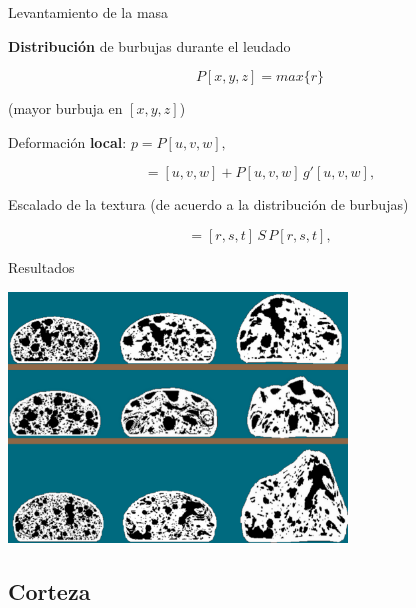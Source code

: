 \documentclass[spanish,unknownkeysallowed]{beamer}
\begin{document}
\begin{frame}{Levantamiento de la masa}

\textbf{Distribución} de burbujas durante el leudado

\begin{equation*}
P[x,y,z] = max \bigg\{r\bigg\}
\end{equation*}

(mayor burbuja en $[x,y,z]$)

\vspace{0.2cm}

Deformación \textbf{local}: $p = P[u,v,w],$

\begin{equation*}
[r,s,t] = [u,v,w] + P[u,v,w] \, g'[u,v,w],
\end{equation*}



Escalado de la textura (de acuerdo a la distribución de burbujas)


\begin{equation}
[x,y,z] = [r,s,t]\, S \, P[r,s,t],
\end{equation}

\end{frame}

\begin{frame}{Resultados}

\centerline{\includegraphics[width=9cm]{../figures/Fig9}}

\end{frame}

\subsection{Corteza}
\end{document}
